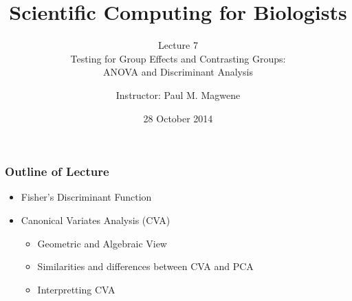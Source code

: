 \documentclass{beamer}
\title{Scientific Computing for Biologists}
\subtitle{Lecture 7 \\
        Testing for Group Effects and Contrasting Groups:\\
         ANOVA and Discriminant Analysis}
\author{Instructor: Paul M. Magwene}
\date{28 October 2014}
\begin{document}
\begin{frame}
\titlepage
\end{frame}


\begin{frame}
  \frametitle{Outline of Lecture}

\begin{itemize}
    \item Fisher's Discriminant Function
    \item Canonical Variates Analysis (CVA)
    \begin{itemize}
        \item Geometric and Algebraic View
        \item Similarities and differences between CVA and PCA
        \item Interpretting CVA
    \end{itemize}

\end{itemize}

\end{frame}





\end{document}
